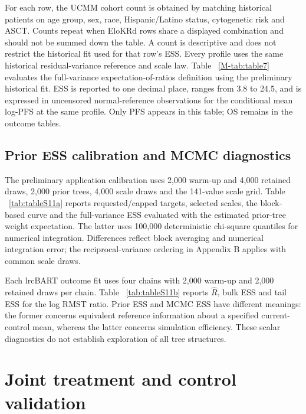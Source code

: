 \documentclass[11pt]{article}
\theoremstyle{remark}\newtheorem{remark}{Remark}[section]
\renewcommand{\thetable}{S\arabic{table}}
\providecommand{\DIFaddtex}[1]{{\protect\color{blue} \sf #1}} %
\providecommand{\DIFaddbegin}{} %
\providecommand{\DIFaddend}{} %
\providecommand{\DIFadd}[1]{\texorpdfstring{\DIFaddtex{#1}}{#1}} %
\begin{document}
For each row, the UCMM cohort count is obtained by matching historical patients on age group, sex, race, Hispanic/Latino status, cytogenetic risk and ASCT. Counts repeat when EloKRd rows share a displayed combination and should not be summed down the table. A count is descriptive and does not restrict the historical fit used for that row's ESS. Every profile uses the same historical residual-variance reference and scale law. Table \DIFaddbegin \DIFadd{~\ref{M-tab:table7} }\DIFaddend evaluates the full-variance expectation-of-ratios definition using the preliminary historical fit. ESS is reported to one decimal place, ranges from 3.8 to 24.5, and is expressed in uncensored normal-reference observations for the conditional mean log-PFS at the same profile. Only PFS appears in this table; OS remains in the outcome tables.

\subsection{Prior ESS calibration and MCMC diagnostics}\label{sec:F.4}
The preliminary application calibration uses 2,000 warm-up and 4,000 retained draws, 2,000 prior trees, 4,000 scale draws and the 141-value scale grid. Table \DIFaddbegin \DIFadd{~\ref{tab:tableS11a} }\DIFaddend reports requested/capped targets, selected scales, the block-based curve and the full-variance ESS evaluated with the estimated prior-tree weight expectation. The latter uses 100,000 deterministic chi-square quantiles for numerical integration. Differences reflect block averaging and numerical integration error; the reciprocal-variance ordering in Appendix B applies with common scale draws.

Each lrcBART outcome fit uses four chains with 2,000 warm-up and 2,000 retained draws per chain. Table \DIFaddbegin \DIFadd{~\ref{tab:tableS11b} }\DIFaddend reports $\widehat R$, bulk ESS and tail ESS for the log RMST ratio. Prior ESS and MCMC ESS have different meanings: the former concerns equivalent reference information about a specified current-control mean, whereas the latter concerns simulation efficiency. These scalar diagnostics do not establish exploration of all tree structures.
\renewcommand{\thetable}{S11(a)}

\clearpage
\renewcommand{\thetable}{S11(b)}

\renewcommand{\thetable}{S\arabic{table}}
\DIFaddbegin \clearpage
 \clearpage
\section{\DIFadd{Joint treatment and control validation}}
\label{sec:G}
\end{document}
